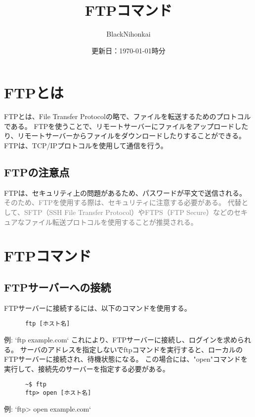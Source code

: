 \documentclass[a4paper,10pt]{jsarticle}
\title{FTPコマンド}
\author{BlackNihonkai}
\date{更新日：\today  \the\hour 時\the\minute 分}
\begin{document}
\maketitle



\section{FTPとは}
    FTPとは、File Transfer Protocolの略で、ファイルを転送するためのプロトコルである。
    FTPを使うことで、リモートサーバーにファイルをアップロードしたり、リモートサーバーからファイルをダウンロードしたりすることができる。
    FTPは、TCP/IPプロトコルを使用して通信を行う。
  \subsection{FTPの注意点}
    FTPは、セキュリティ上の問題があるため、パスワードが平文で送信される。\\
    \textcolor{gray}{そのため、FTPを使用する際は、セキュリティに注意する必要がある。}
    \textcolor{gray}{代替として、SFTP（SSH File Transfer Protocol）やFTPS（FTP Secure）などのセキュアなファイル転送プロトコルを使用することが推奨される。}

\section{FTPコマンド}
  \subsection{FTPサーバーへの接続}
    FTPサーバーに接続するには、以下のコマンドを使用する。
    \begin{lstlisting}
      ftp [ホスト名]
    \end{lstlisting}
    例: `ftp example.com`
    これにより、FTPサーバーに接続し、ログインを求められる。
    サーバのアドレスを指定しないでftpコマンドを実行すると、ローカルのFTPサーバーに接続され、待機状態になる。
    この場合には、"open"コマンドを実行して、接続先のサーバーを指定する必要がある。  
    \begin{lstlisting}
      ~$ ftp
      ftp> open [ホスト名]
    \end{lstlisting}
    例: `ftp> open example.com` 
\end{document}
